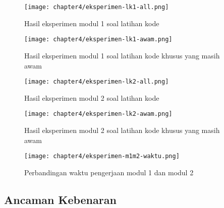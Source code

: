 \begin{figure}[H]
  \centering
  \texttt{[image: chapter4/eksperimen-lk1-all.png]}
  \caption{Hasil eksperimen modul 1 soal latihan kode} \label{fig:eksperimen-lk1-all}
\end{figure}
\begin{figure}[H]
  \centering
  \texttt{[image: chapter4/eksperimen-lk1-awam.png]}
  \caption{Hasil eksperimen modul 1 soal latihan kode khusus yang masih awam} \label{fig:eksperimen-lk1-awam}
\end{figure}
\blindtext
\begin{figure}[H]
  \centering
  \texttt{[image: chapter4/eksperimen-lk2-all.png]}
  \caption{Hasil eksperimen modul 2 soal latihan kode} \label{fig:eksperimen-lk2-all}
\end{figure}
\begin{figure}[H]
  \centering
  \texttt{[image: chapter4/eksperimen-lk2-awam.png]}
  \caption{Hasil eksperimen modul 2 soal latihan kode khusus yang masih awam} \label{fig:eksperimen-lk2-awam}
\end{figure}
\blindtext

\begin{figure}[H]
  \centering
  \texttt{[image: chapter4/eksperimen-m1m2-waktu.png]}
  \caption{Perbandingan waktu pengerjaan modul 1 dan modul 2} \label{fig:eksperimen-m1m2-waktu}
\end{figure}
\blindtext

\subsection{Ancaman Kebenaran}
\blindtext